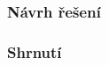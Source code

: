 \begin{frame}
    \frametitle{Návrh řešení}
\end{frame}

\begin{frame}
    \frametitle{Shrnutí}
\end{frame}






%
%
%


